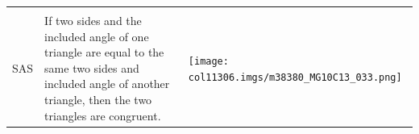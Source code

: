 \begin{table}[H]
\begin{center}
\begin{xtabular*}{\mytablewidth}[t]{|p{10\mystarwidth}|p{10\mystarwidth}|p{10\mystarwidth}|}
\begin{center}
      \vspace{2pt}
    \vspace{.1in}
    
    \end{center}



    \addtocounter{footnote}{-0}
    
     \tabularnewline{}
    
    
        SAS &
    
    
        If two sides and the included angle of one triangle are equal to the same two sides and included angle of another triangle, then the two triangles are congruent. &
    
    
        
                    
    \setcounter{subfigure}{0}

\label{m38380*id318143}
    \begin{center}
    \label{m38380*id318143!!!underscore!!!media}\label{m38380*id318143!!!underscore!!!printimage}\texttt{[image: col11306.imgs/m38380\_MG10C13\_033.png]} %
        
      \vspace{2pt}
    \vspace{.1in}
    
    \end{center}



    \addtocounter{footnote}{-0}
    
     \tabularnewline{}
    

\end{xtabular*}
\end{center}
\end{table}
